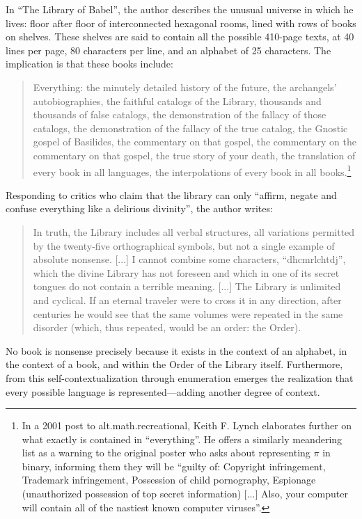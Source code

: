\documentclass{thesis}
\begin{document}
In ``The Library of Babel'', the author describes the unusual universe in which he lives: floor after floor of interconnected hexagonal rooms, lined with rows of books on shelves. These shelves are said to contain all the possible 410-page texts, at 40 lines per page, 80 characters per line, and an alphabet of 25 characters. The implication is that these books include:

	\begin{quote}
	Everything: the minutely detailed history of the future, the archangels' autobiographies, the faithful catalogs of the Library, thousands and thousands of false catalogs, the demonstration of the fallacy of those catalogs, the demonstration of the fallacy of the true catalog, the Gnostic gospel of Basilides, the commentary on that gospel, the commentary on the commentary on that gospel, the true story of your death, the translation of every book in all languages, the interpolations of every book in all books.\footnote{In a 2001 post to alt.math.recreational, Keith F. Lynch elaborates further on what exactly is contained in ``everything''.\cite{keith_f._lynch_converting_????} He offers a similarly meandering list as a warning to the original poster who asks about representing $\pi$ in binary, informing them they will be ``guilty of: Copyright infringement, Trademark infringement, Possession of child pornography, Espionage (unauthorized possession of top secret information) [...] Also, your computer will contain all of the nastiest known computer viruses''.}
	\end{quote}

Responding to critics who claim that the library can only ``affirm, negate and confuse everything like a delirious divinity'', the author writes:
	
	\begin{quote}
	In truth, the Library includes all verbal structures, all variations permitted by the twenty-five orthographical symbols, but not a single example of absolute nonsense. [...] I cannot combine some characters, ``dhcmrlchtdj'', which the divine Library has not foreseen and which in one of its secret tongues do not contain a terrible meaning. [...] The Library is unlimited and cyclical. If an eternal traveler were to cross it in any direction, after centuries he would see that the same volumes were repeated in the same disorder (which, thus repeated, would be an order: the Order).
	\end{quote}
	
No book is nonsense precisely because it exists in the context of an alphabet, in the context of a book, and within the Order of the Library itself. Furthermore, from this self-contextualization through enumeration emerges the realization that every possible language is represented---adding another degree of context.
	
\end{document}
